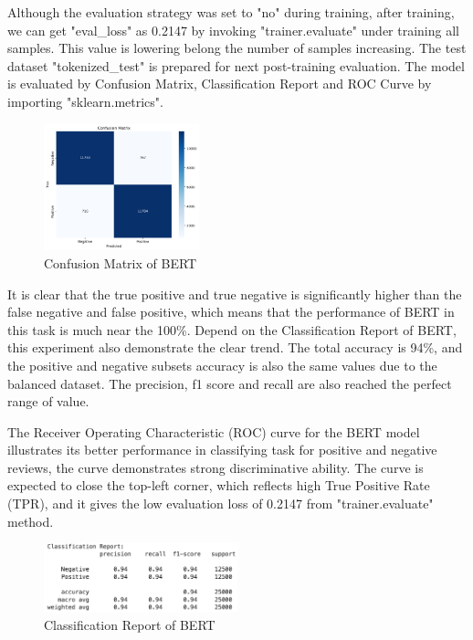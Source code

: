 Although the evaluation strategy was set to "no" during training, after training, we can get "eval\_loss" as 0.2147 by invoking "trainer.evaluate" under training all samples. This value is lowering belong the number of samples increasing. The test dataset "tokenized\_test" is prepared for next post-training evaluation. The model is evaluated by Confusion Matrix, Classification Report and ROC Curve by importing "sklearn.metrics".

\begin{figure}[ht]
    \centering
    \includegraphics[width=0.4\textwidth]{pics/bert_matrix.png}
    \caption{Confusion Matrix of BERT}
\end{figure}

It is clear that the true positive and true negative is significantly higher than the false negative and false positive, which means that the performance of BERT in this task is much near the 100\%. Depend on the Classification Report of BERT, this experiment also demonstrate the clear trend. The total accuracy is 94\%, and the positive and negative subsets accuracy is also the same values due to the balanced dataset. The precision, f1 score and recall are also reached the perfect range of value.

The Receiver Operating Characteristic (ROC) curve for the BERT model illustrates its better performance in classifying task for positive and negative reviews, the curve demonstrates strong discriminative ability. The curve is expected to close the top-left corner, which reflects high True Positive Rate (TPR), and it gives the low evaluation loss of 0.2147 from "trainer.evaluate" method. 

\begin{figure}[ht]
    \centering
    \includegraphics[width=0.5\textwidth]{pics/bert_eval_report.png}
    \caption{Classification Report of BERT}
\end{figure}

